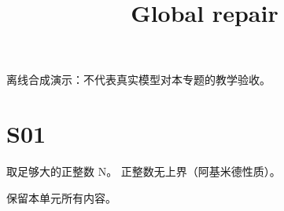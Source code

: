 \documentclass[UTF8,fontset=fandol,11pt]{ctexart}
\title{Global repair}
\date{}
\begin{document}
\maketitle
\par\noindent 离线合成演示：不代表真实模型对本专题的教学验收。\par
\section{S01}\label{sec:S01}
取足够大的正整数 N。 正整数无上界（阿基米德性质）。\par
保留本单元所有内容。\par
\end{document}
